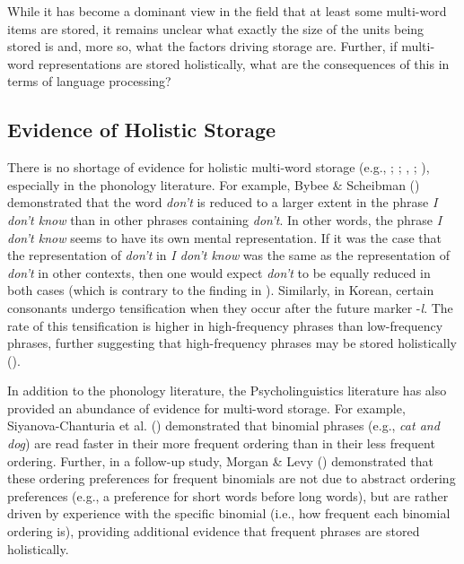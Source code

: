 \documentclass[
  12pt,
  letterpaper,
]{scrreport}
\begin{document}
While it has become a dominant view in the field that at least some
multi-word items are stored, it remains unclear what exactly the size of
the units being stored is and, more so, what the factors driving storage
are. Further, if multi-word representations are stored holistically,
what are the consequences of this in terms of language processing?

\subsection{Evidence of Holistic
Storage}\label{evidence-of-holistic-storage}

There is no shortage of evidence for holistic multi-word storage (e.g.,
;
; ,
;
), especially in the phonology literature. For example, Bybee \&
Scheibman ()
demonstrated that the word \emph{don't} is reduced to a larger extent in
the phrase \emph{I don't know} than in other phrases containing
\emph{don't}. In other words, the phrase \emph{I don't know} seems to
have its own mental representation. If it was the case that the
representation of \emph{don't} in \emph{I don't know} was the same as
the representation of \emph{don't} in other contexts, then one would
expect \emph{don't} to be equally reduced in both cases (which is
contrary to the finding in
).
Similarly, in Korean, certain consonants undergo tensification when they
occur after the future marker -\emph{l}. The rate of this tensification
is higher in high-frequency phrases than low-frequency phrases, further
suggesting that high-frequency phrases may be stored holistically
().

In addition to the phonology literature, the Psycholinguistics
literature has also provided an abundance of evidence for multi-word
storage. For example, Siyanova-Chanturia et al.
()
demonstrated that binomial phrases (e.g., \emph{cat and dog}) are read
faster in their more frequent ordering than in their less frequent
ordering. Further, in a follow-up study, Morgan \& Levy
() demonstrated
that these ordering preferences for frequent binomials are not due to
abstract ordering preferences (e.g., a preference for short words before
long words), but are rather driven by experience with the specific
binomial (i.e., how frequent each binomial ordering is), providing
additional evidence that frequent phrases are stored holistically.
\end{document}
